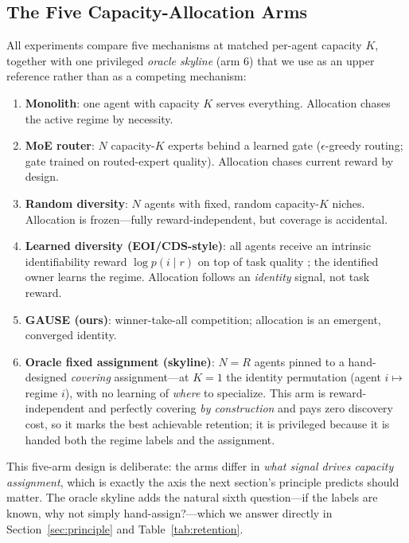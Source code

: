 \documentclass[10pt]{article}
\begin{document}
\subsection{The Five Capacity-Allocation Arms}

All experiments compare five mechanisms at matched per-agent capacity $K$,
together with one privileged \emph{oracle skyline} (arm 6) that we use as an
upper reference rather than as a competing mechanism:

\begin{enumerate}[itemsep=2pt]
    \item \textbf{Monolith}: one agent with capacity $K$ serves everything.
    Allocation chases the active regime by necessity.
    \item \textbf{MoE router}: $N$ capacity-$K$ experts behind a learned gate
    ($\epsilon$-greedy routing; gate trained on routed-expert quality).
    Allocation chases current reward by design.
    \item \textbf{Random diversity}: $N$ agents with fixed, random capacity-$K$
    niches. Allocation is frozen---fully reward-independent, but coverage is
    accidental.
    \item \textbf{Learned diversity (EOI/CDS-style)}: all agents receive an
    intrinsic identifiability reward $\log p(i \mid r)$ on top of task quality
    \cite{jiang2021eoi, li2021cds};
    the identified owner learns the regime. Allocation follows an
    \emph{identity} signal, not task reward.
    \item \textbf{GAUSE (ours)}: winner-take-all competition;
    allocation is an emergent, converged identity.
    \item \textbf{Oracle fixed assignment (skyline)}: $N{=}R$ agents pinned to a
    hand-designed \emph{covering} assignment---at $K{=}1$ the identity permutation
    (agent $i \mapsto$ regime $i$), with no learning of \emph{where} to specialize.
    This arm is reward-independent and perfectly covering \emph{by construction} and
    pays zero discovery cost, so it marks the best achievable retention; it is
    privileged because it is handed both the regime labels and the assignment.
\end{enumerate}

This five-arm design is deliberate: the arms differ in \emph{what signal drives
capacity assignment}, which is exactly the axis the next section's principle
predicts should matter. The oracle skyline adds the natural sixth question---if
the labels are known, why not simply hand-assign?---which we answer directly in
Section~\ref{sec:principle} and Table~\ref{tab:retention}.
\end{document}
